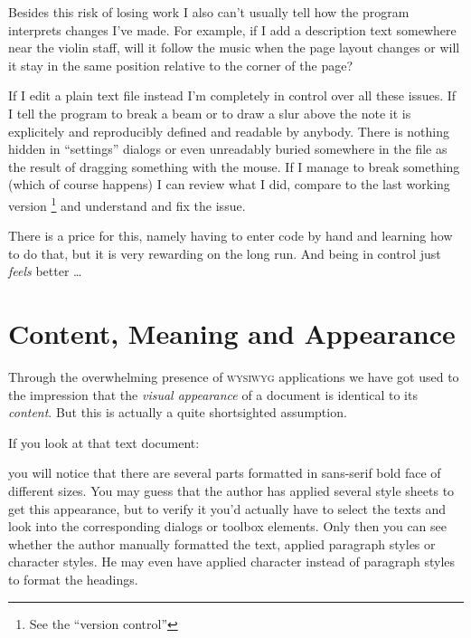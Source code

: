 \documentclass[../../LilyPond-Tutorials]{subfiles}
\begin{document}
Besides this risk of losing work I also can't usually tell how the program interprets changes I've made.
For example, if I add a description text somewhere near the violin staff, will it follow the music when the page layout changes or will it stay in the same position relative to the corner of the page?

 If I edit a plain text file instead I'm completely in control over all these issues.
If I tell the program to break a beam or to draw a slur above the note it is explicitely and reproducibly defined and readable by anybody.
There is nothing hidden in “settings” dialogs or even unreadably buried somewhere in the file as the result of dragging something with the mouse.
If I manage to break something (which of course happens) I can review what I did, compare to the last working version%
\footnote{See the “version control” }
and understand and fix the issue.

There is a price for this, namely having to enter code by hand and learning how to do that, but it is very rewarding on the long run.
And being in control just \emph{feels} better \dots

\section{Content, Meaning and Appearance}
\label{sec:pt_separation-content-meaning-appearance}
Through the overwhelming presence of \textsc{wysiwyg} applications we have got used to the impression that the \emph{visual appearance} of a document is identical to its \emph{content}.
But this is actually a quite shortsighted assumption.

If you look at that text document:

\begin{center}
\noindent{}\end{center}

\noindent you will notice that there are several parts formatted in sans-serif bold face of different sizes.
You may guess that the author has applied several style sheets to get this appearance, but to verify it you'd actually have to select the texts and look into the corresponding dialogs or toolbox elements.
Only then you can see whether the author manually formatted the text, applied paragraph styles or character styles.
He may even have applied character instead of paragraph styles to format the headings.
\end{document}
